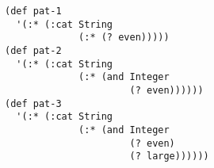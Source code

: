 \begin{lstlisting}[style=reclojureClojure]
(def pat-1
  '(:* (:cat String
             (:* (? even)))))
(def pat-2
  '(:* (:cat String
             (:* (and Integer 
                      (? even))))))
(def pat-3
  '(:* (:cat String
             (:* (and Integer
                      (? even)
                      (? large))))))
\end{lstlisting}
